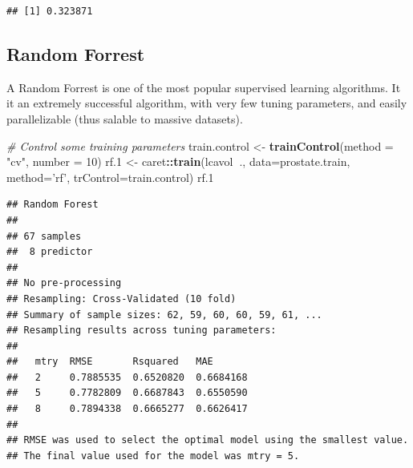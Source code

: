 \documentclass[]{book}
\newenvironment{Shaded}{\begin{snugshade}}{\end{snugshade}}
\newcommand{\KeywordTok}[1]{\textcolor[rgb]{0.13,0.29,0.53}{\textbf{#1}}}
\newcommand{\DataTypeTok}[1]{\textcolor[rgb]{0.13,0.29,0.53}{#1}}
\newcommand{\DecValTok}[1]{\textcolor[rgb]{0.00,0.00,0.81}{#1}}
\newcommand{\StringTok}[1]{\textcolor[rgb]{0.31,0.60,0.02}{#1}}
\newcommand{\CommentTok}[1]{\textcolor[rgb]{0.56,0.35,0.01}{\textit{#1}}}
\newcommand{\OperatorTok}[1]{\textcolor[rgb]{0.81,0.36,0.00}{\textbf{#1}}}
\newcommand{\NormalTok}[1]{#1}
\theoremstyle{definition}
\theoremstyle{definition}
\theoremstyle{definition}
\theoremstyle{remark}
\begin{document}
\begin{verbatim}
## [1] 0.323871
\end{verbatim}

\subsection{Random Forrest}\label{random-forrest}

A Random Forrest is one of the most popular supervised learning
algorithms. It it an extremely successful algorithm, with very few
tuning parameters, and easily parallelizable (thus salable to massive
datasets).

\begin{Shaded}
\begin{Highlighting}[]
\CommentTok{# Control some training parameters}
\NormalTok{train.control <-}\StringTok{ }\KeywordTok{trainControl}\NormalTok{(}\DataTypeTok{method =} \StringTok{"cv"}\NormalTok{, }\DataTypeTok{number =} \DecValTok{10}\NormalTok{)}
\NormalTok{rf.}\DecValTok{1}\NormalTok{ <-}\StringTok{ }\NormalTok{caret}\OperatorTok{::}\KeywordTok{train}\NormalTok{(lcavol}\OperatorTok{~}\NormalTok{., }\DataTypeTok{data=}\NormalTok{prostate.train, }
                \DataTypeTok{method=}\StringTok{'rf'}\NormalTok{, }
                \DataTypeTok{trControl=}\NormalTok{train.control)}
\NormalTok{rf.}\DecValTok{1}
\end{Highlighting}
\end{Shaded}

\begin{verbatim}
## Random Forest 
## 
## 67 samples
##  8 predictor
## 
## No pre-processing
## Resampling: Cross-Validated (10 fold) 
## Summary of sample sizes: 62, 59, 60, 60, 59, 61, ... 
## Resampling results across tuning parameters:
## 
##   mtry  RMSE       Rsquared   MAE      
##   2     0.7885535  0.6520820  0.6684168
##   5     0.7782809  0.6687843  0.6550590
##   8     0.7894338  0.6665277  0.6626417
## 
## RMSE was used to select the optimal model using the smallest value.
## The final value used for the model was mtry = 5.
\end{verbatim}

\begin{Shaded}
\end{Shaded}
\end{document}
